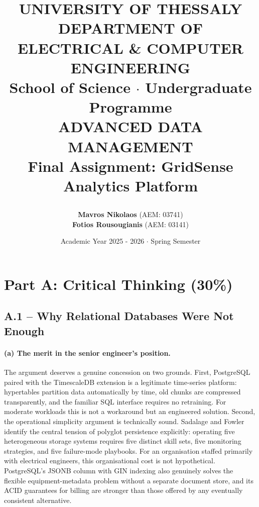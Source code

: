 \documentclass[11pt, a4paper]{article}
\title{
    \vspace{-2cm}
    \begin{center}
        \large UNIVERSITY OF THESSALY \\
        DEPARTMENT OF ELECTRICAL \& COMPUTER ENGINEERING \\
        School of Science $\cdot$ Undergraduate Programme \\
        \vspace{1.5cm}
        \textbf{\Huge ADVANCED DATA MANAGEMENT} \\
        \vspace{0.5cm}
        \Large Final Assignment: GridSense Analytics Platform
    \end{center}
}
\author{
    \textbf{Mavros Nikolaos} (AEM: 03741) \\
    \textbf{Fotios Rousougianis} (AEM: 03141)
}
\date{\vspace{1cm} Academic Year 2025 - 2026 $\cdot$ Spring Semester}
\makeatletter
\renewcommand{\_}{\origunderscore\penalty\z@\hskip\z@skip}
\renewcommand{\{}{\origlbrace\penalty\z@\hskip\z@skip}
\renewcommand{\}}{\origrbrace\penalty\z@\hskip\z@skip}
\makeatother
\begin{document}
\maketitle
\thispagestyle{empty} 

\newpage
\tableofcontents
\newpage

\section*{Part A: Critical Thinking (30\%)}

\subsection{A.1 -- Why Relational Databases Were Not Enough}

\paragraph{(a) The merit in the senior engineer's position.}
The argument deserves a genuine concession on two grounds. First,
PostgreSQL paired with the TimescaleDB extension is a legitimate
time-series platform: hypertables partition data automatically by time,
old chunks are compressed transparently, and the familiar SQL interface
requires no retraining. For moderate workloads this is not a workaround
but an engineered solution. Second, the operational simplicity argument
is technically sound. Sadalage and Fowler~\cite{sadalage2012} identify
the central tension of polyglot persistence explicitly: operating five
heterogeneous storage systems requires five distinct skill sets, five
monitoring strategies, and five failure-mode playbooks. For an
organisation staffed primarily with electrical engineers, this
organisational cost is not hypothetical. PostgreSQL's JSONB column with
GIN indexing also genuinely solves the flexible equipment-metadata
problem without a separate document store, and its ACID guarantees for
billing are stronger than those offered by any eventually consistent
alternative.
\end{document}
